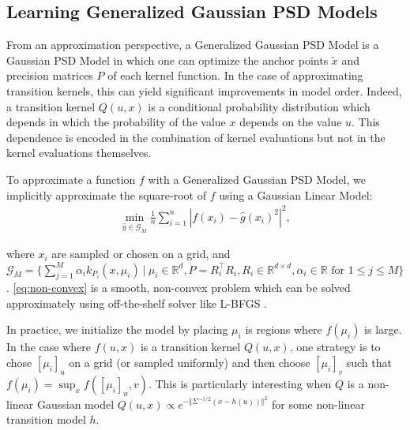 \subsection{Learning Generalized Gaussian PSD Models}\label{sec:learning-general}
From an approximation perspective, a Generalized Gaussian PSD Model is a Gaussian PSD Model in which one can optimize the anchor points $\tilde x$ and precision matrices $P$ of each kernel function. In the case of approximating transition kernels, this can yield significant improvements in model order. Indeed, a transition kernel $Q(u, x)$ is a conditional probability distribution which depends in which the probability of the value $x$ depends on the value $u$. This dependence is encoded in the combination of kernel evaluations but not in the kernel evaluations themselves.

To approximate a function $f$ with a Generalized Gaussian PSD Model, we implicitly approximate the square-root of $f$ using a Gaussian Linear Model:
\begin{align}\label{eq:non-convex}
    \min_{\hat g \in \mathcal G_M} \frac{1}{n}\sum_{i=1}^n \left\vert f(x_i)- \hat g(x_i)^2\right\vert^2,
\end{align}

where $x_i$ are sampled or chosen on a grid, and $\mathcal G_M = \lbrace \sum_{j=1}^M\alpha_i k_{P_i}(x, \mu_i) ~\vert~ \mu_i \in \mathbb R^d, P = R_i^\top R_i, R_i \in\mathbb R^{d\times d}, \alpha_i \in \mathbb R \text{ for } 1\leq j\leq M \rbrace$. \cref{eq:non-convex} is a smooth, non-convex problem which can be solved approximately using off-the-shelf solver like L-BFGS \citep{lbfgs}.

In practice, we initialize the model by placing $\mu_i$ is regions where $f(\mu_i)$ is large. In the case where $f(u, x)$ is a transition kernel $Q(u, x)$, one strategy is to chose $[\mu_i]_u$ on a grid (or sampled uniformly) and then choose $[\mu_i]_v$ such that $f(\mu_i) = \sup_x f([\mu_i]_u, v)$. This is particularly interesting when $Q$ is a non-linear Gaussian model $Q(u, x) \propto e^{-\Vert\Sigma^{-1/2}(x - h(u))\Vert^2}$ for some non-linear transition model $h$.
